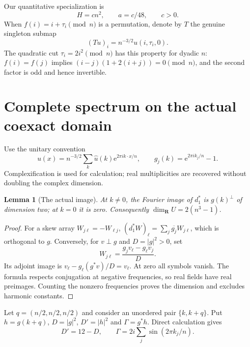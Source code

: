 \documentclass[11pt]{article}
\newcommand{\R}{\mathbf R}
\newcommand{\e}{\mathrm e}
\newtheorem{lemma}[theorem]{Lemma}
\theoremstyle{definition}
\theoremstyle{remark}
\begin{document}
Our quantitative specialization is
\begin{equation}\label{eq:special}
             H=cn^2,\qquad a=c/48,\qquad c>0.
\end{equation}
When $f(i)=i+\tau_i\pmod n$ is a permutation, denote by $T$ the genuine
singleton submap
\begin{equation}\label{eq:T}
             (Tu)_i=n^{-3/2}u(i,\tau_i,0).
\end{equation}
The quadratic cut $\tau_i=2i^2\pmod n$ has this property for dyadic $n$:
$f(i)=f(j)$ implies $(i-j)(1+2(i+j))=0\pmod n$, and the second factor is
odd and hence invertible.

\section{Complete spectrum on the actual coexact domain}\label{sec:spectrum}
Use the unitary convention
\[
 u(x)=n^{-3/2}\sum_k\widehat u(k)\e^{2\pi i k\cdot x/n},\qquad
 g_j(k)=\e^{2\pi i k_j/n}-1.
\]
Complexification is used for calculation; real multiplicities are recovered
without doubling the complex dimension.

\begin{lemma}[The actual image]\label{lem:image}
At $k\ne0$, the Fourier image of $d_1^*$ is $g(k)^\perp$ of dimension two;
at $k=0$ it is zero. Consequently $\dim_\R U=2(n^3-1)$.
\end{lemma}
\begin{proof}
For a skew array $W_{j\ell}=-W_{\ell j}$,
$(d_1^*W)_\ell=\sum_j\overline{g_j}W_{j\ell}$, which is orthogonal to
$g$. Conversely, for $v\perp g$ and $D=|g|^2>0$, set
\[
              W_{j\ell}=\frac{g_jv_\ell-g_\ell v_j}{D}.
\]
Its adjoint image is $v_\ell-g_\ell(g^*v)/D=v_\ell$. At zero all symbols
vanish. The formula respects conjugation at negative frequencies, so real
fields have real preimages. Counting the nonzero frequencies proves the
dimension and excludes harmonic constants.
\end{proof}

Let $q=(n/2,n/2,n/2)$ and consider an unordered pair $\{k,k+q\}$. Put
$h=g(k+q)$, $D=|g|^2$, $D'=|h|^2$ and $\Gamma=g^*h$. Direct calculation gives
\begin{equation}\label{eq:symbols}
 D'=12-D,\qquad \Gamma=2i\sum_j\sin(2\pi k_j/n).
\end{equation}
\end{document}
